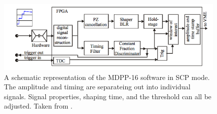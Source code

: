 \begin{figure}[!t]
    \centering
    \includegraphics[scale=0.65]{Future_Figs/MDPP_Schematic.png}
    \caption{A schematic representation of the MDPP-16 software in SCP mode. The amplitude and timing are separateing out into individual signals. Signal properties, shaping time, and the threshold can all be adjusted. Taken from \citep{mesytec:_mdpp}.}
    \label{fig:mdpp_schematic}
\end{figure}
